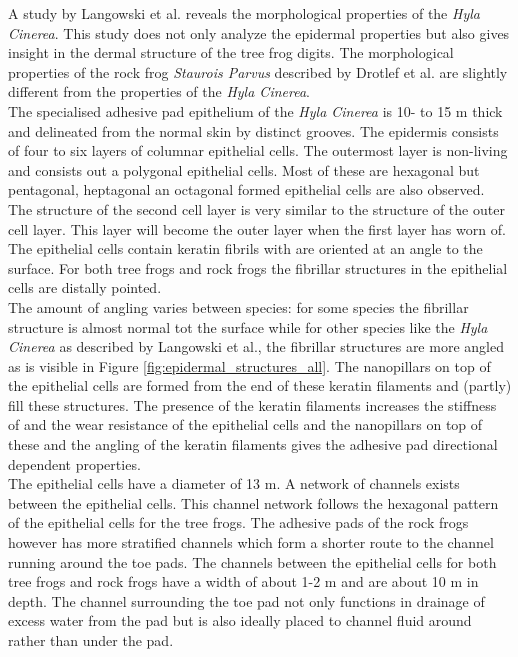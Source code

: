 \qquad A study by Langowski et al.\cite{langowski2018force} reveals the morphological properties of the \textit{Hyla Cinerea}. This study does not only analyze the epidermal properties but also gives insight in the dermal structure of the tree frog digits. The morphological properties of the rock  frog \textit{Staurois Parvus} described by Drotlef et al. \cite{drotlef2015morphological} are slightly different from the properties of the \textit{Hyla Cinerea}.\\ 

\qquad The specialised adhesive pad epithelium of the \textit{Hyla Cinerea} is 10- to 15 \textmu m thick and delineated from the normal skin by distinct grooves. The epidermis consists of four to six layers of columnar epithelial cells. The outermost layer is non-living and consists out a polygonal epithelial cells. Most of these are hexagonal but pentagonal, heptagonal an octagonal formed epithelial cells are also observed. The structure of the second cell layer is very similar to the structure of the outer cell layer. This layer will become the outer layer when the first layer has worn of. The epithelial cells contain keratin fibrils with are oriented at an angle to the surface. For both tree frogs and rock frogs the fibrillar structures in the epithelial cells are distally pointed.\\ 

\qquad The amount of angling varies between species: for some species the fibrillar structure is almost normal tot the surface while for other species like the \textit{Hyla Cinerea} as described by Langowski et al.\cite{langowski2018force}, the fibrillar structures are more angled as is visible in Figure \ref{fig:epidermal_structures_all}. The nanopillars on top of the epithelial cells are formed from the end of these keratin filaments and (partly) fill these structures. The presence of the keratin filaments increases the stiffness of and the wear resistance of the epithelial cells and the nanopillars on top of these and the angling of the keratin filaments gives the adhesive pad directional dependent properties.\\ 

\qquad The epithelial cells have a diameter of 13 \textmu m. A network of channels exists between the epithelial cells. This channel network follows the hexagonal pattern of the epithelial cells for the tree frogs. The adhesive pads of the rock frogs however has more stratified channels which form a shorter route to the channel running around the toe pads. The channels between the epithelial cells for both tree frogs and rock frogs have a width of about 1-2 \textmu m and are about 10 \textmu m in depth. The channel surrounding the toe pad not only functions in drainage of excess water from the pad but is also ideally placed to channel fluid around rather than under the pad.


